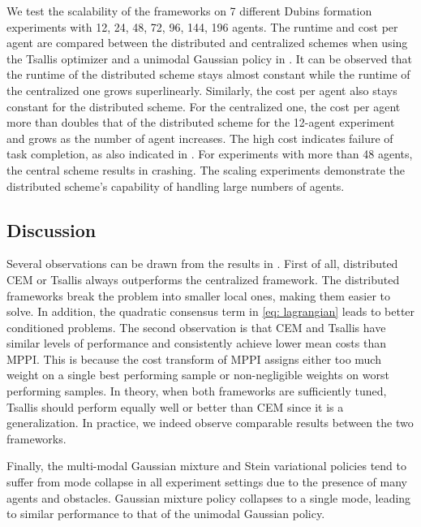\documentclass[twoside,11pt]{article}
\begin{document}
We test the scalability of the frameworks on 7 different Dubins formation experiments with 12, 24, 48, 72, 96, 144, 196 agents. The runtime and cost per agent are compared between the distributed and centralized schemes when using the Tsallis optimizer and a unimodal Gaussian policy in . It can be observed that the runtime of the distributed scheme stays almost constant while the runtime of the centralized one grows superlinearly. Similarly, the cost per agent also stays constant for the distributed scheme. For the centralized one, the cost per agent more than doubles that of the distributed scheme for the 12-agent experiment and grows as the number of agent increases. The high cost indicates failure of task completion, as also indicated in . For experiments with more than 48 agents, the central scheme results in crashing. The scaling experiments demonstrate the distributed scheme's capability of handling large numbers of agents.

\subsection{Discussion}
Several observations can be drawn from the results in . First of all, distributed \ac{CEM} or Tsallis always outperforms the centralized framework. The distributed frameworks break the problem into smaller local ones, making them easier to solve. In addition, the quadratic consensus term in \cref{eq: lagrangian} leads to better conditioned problems. The second observation is that \ac{CEM} and Tsallis have similar levels of performance and consistently achieve lower mean costs than \ac{MPPI}. This is because the cost transform of \ac{MPPI} assigns either too much weight on a single best performing sample or non-negligible weights on worst performing samples. In theory, when both frameworks are sufficiently tuned, Tsallis should perform equally well or better than \ac{CEM} since it is a generalization. In practice, we indeed observe comparable results between the two frameworks. 

Finally, the multi-modal Gaussian mixture and Stein variational policies tend to suffer from mode collapse in all experiment settings due to the presence of many agents and obstacles. Gaussian mixture policy collapses to a single mode, leading to similar performance to that of the unimodal Gaussian policy. 
\end{document}
